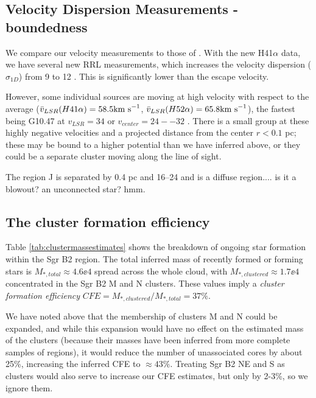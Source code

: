 \documentclass[twocolumn]{aastex61}
\begin{document}
\subsection{Velocity Dispersion Measurements - boundedness}

We compare our velocity measurements to those of \citet{De-Pree2011a}.
With the new H41$\alpha$ data, we have several new RRL measurements, which increases the velocity dispersion ($\sigma_{1D}$)
from 9 \kms to 12 \kms.  This is significantly lower than the escape velocity.

However, some individual sources are moving at high velocity with respect to
the average ($\bar{v}_{LSR}(H41\alpha) = 58.5 \textrm{km~s}^{-1}$,
$\bar{v}_{LSR}(H52\alpha) = 65.8 \textrm{km~s}^{-1}$), the fastest being G10.47 at
$v_{LSR}=34$ \kms or $v_{center}=24--32$ \kms.  There is a small group
at these highly negative velocities and a projected distance from the center $r<0.1$ pc;
these may be bound to a higher potential than we have inferred above, or they
could be a separate cluster moving along the line of sight.

The \hii region J is separated by 0.4 pc and 16--24 \kms and is a diffuse \hii region.... is it a blowout?   an unconnected star?  hmm.

\subsection{The cluster formation efficiency}
Table \ref{tab:clustermassestimates} shows the breakdown of ongoing star
formation within the Sgr B2 region.  The total inferred mass of recently
formed or forming stars is $M_{*,total}\approx4.6\ee{4}$ \msun spread across
the whole cloud, with $M_{*,clustered}\approx1.7\ee{4}$ \msun concentrated
in the Sgr B2 M and N clusters.  These values imply a \textit{cluster
formation efficiency} $CFE=M_{*,clustered}/M_{*,total} = 37\%$.

We have noted above that the membership of clusters M and N could be expanded,
and while this expansion would have no effect on the estimated mass of the clusters
(because their masses have been inferred from more complete samples of \hii regions),
it would reduce the number of unassociated cores by about 25\%, increasing the inferred
CFE to $\approx43\%$. %
Treating Sgr B2 NE and S as clusters would also serve to increase our CFE estimates,
but only by 2-3\%, so we ignore them.


\end{document}
